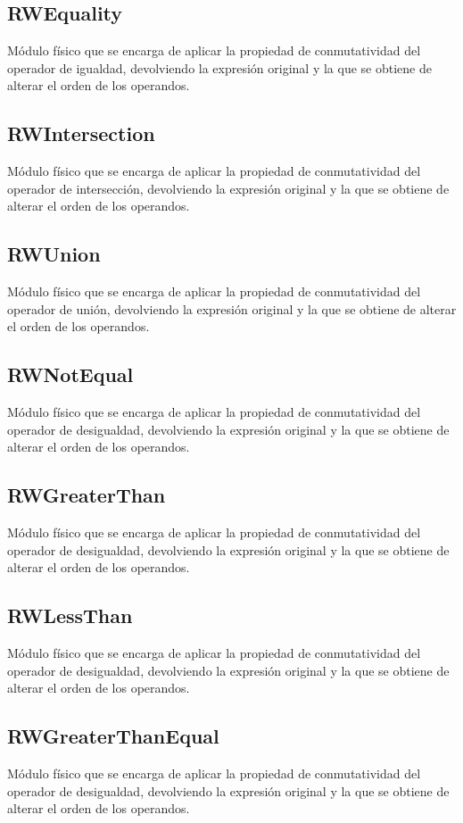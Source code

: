 \documentclass[a4paper,10pt]{report}
\begin{document}
				\subsection{RWEquality}
				Módulo físico que se encarga de aplicar la propiedad de conmutatividad del operador de igualdad, devolviendo la expresión original y la que se obtiene de alterar el orden de los operandos.
				\subsection{RWIntersection}
				Módulo físico que se encarga de aplicar la propiedad de conmutatividad del operador de intersección, devolviendo la expresión original y la que se obtiene de alterar el orden de los operandos.
				\subsection{RWUnion}
				Módulo físico que se encarga de aplicar la propiedad de conmutatividad del operador de unión, devolviendo la expresión original y la que se obtiene de alterar el orden de los operandos.
				\subsection{RWNotEqual}
				Módulo físico que se encarga de aplicar la propiedad de conmutatividad del operador de desigualdad, devolviendo la expresión original y la que se obtiene de alterar el orden de los operandos.
				\subsection{RWGreaterThan}
				Módulo físico que se encarga de aplicar la propiedad de conmutatividad del operador de desigualdad, devolviendo la expresión original y la que se obtiene de alterar el orden de los operandos.
				\subsection{RWLessThan}
				Módulo físico que se encarga de aplicar la propiedad de conmutatividad del operador de desigualdad, devolviendo la expresión original y la que se obtiene de alterar el orden de los operandos.
				\subsection{RWGreaterThanEqual}
				Módulo físico que se encarga de aplicar la propiedad de conmutatividad del operador de desigualdad, devolviendo la expresión original y la que se obtiene de alterar el orden de los operandos.
\end{document}
